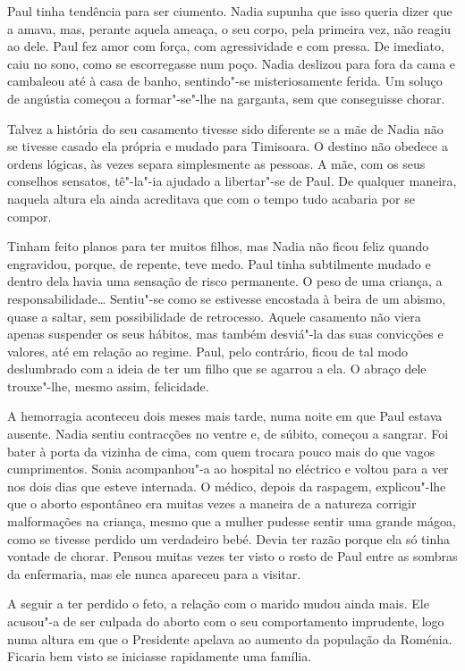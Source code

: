Paul tinha tendência para ser ciumento. Nadia
supunha que isso queria dizer que a amava, mas, perante aquela ameaça, o
seu corpo, pela primeira vez, não reagiu ao dele. Paul fez amor com
força, com agressividade e com pressa. De imediato, caiu no sono, como
se escorregasse num poço. Nadia deslizou para fora da cama e cambaleou
até à casa de banho, sentindo"-se misteriosamente ferida. Um soluço de
angústia começou a formar"-se"-lhe na garganta,
sem que conseguisse chorar.

Talvez a história do seu casamento tivesse sido diferente se a mãe de
Nadia não se tivesse casado ela própria e mudado para Timisoara. O
destino não obedece a ordens lógicas, às vezes separa simplesmente as
pessoas. A mãe, com os seus conselhos sensatos, tê"-la"-ia ajudado a
libertar"-se de Paul. De qualquer maneira, naquela altura ela ainda acreditava
que com o tempo tudo acabaria por se compor.

Tinham feito planos para ter muitos filhos, mas Nadia não ficou feliz
quando engravidou, porque, de repente, teve medo. Paul tinha subtilmente
mudado e dentro dela havia uma sensação de risco permanente. O peso de
uma criança, a responsabilidade\ldots{} Sentiu"-se como se estivesse
encostada à beira de um abismo, quase a saltar, sem possibilidade de
retrocesso. Aquele casamento não viera apenas suspender os seus
hábitos, mas também desviá"-la das suas convicções e valores, até em
relação ao regime. Paul, pelo contrário, ficou de tal modo deslumbrado
com a ideia de ter um filho que se agarrou a ela. O abraço dele trouxe"-lhe, mesmo assim, felicidade.

A hemorragia aconteceu dois meses mais tarde, numa noite em que Paul
estava ausente. Nadia sentiu contracções no ventre e, de súbito,
começou a sangrar. Foi bater à porta da vizinha de cima, com quem
trocara pouco mais do que vagos cumprimentos. Sonia acompanhou"-a ao
hospital no eléctrico e voltou para a ver nos dois dias que esteve
internada. O médico, depois da raspagem, explicou"-lhe que o aborto
espontâneo era muitas vezes a maneira de a natureza corrigir
malformações na criança, mesmo que a mulher pudesse sentir uma grande
mágoa, como se tivesse perdido um verdadeiro bebé. Devia ter razão
porque ela só tinha vontade de chorar. Pensou muitas vezes ter visto o
rosto de Paul entre as sombras da enfermaria, mas ele nunca apareceu
para a visitar.

A seguir a ter perdido o feto, a relação com o marido
mudou ainda mais. Ele acusou"-a de ser culpada do aborto com o seu
comportamento imprudente, logo numa altura em que o Presidente apelava
ao aumento da população
da Roménia. Ficaria bem visto se iniciasse rapidamente uma família.

